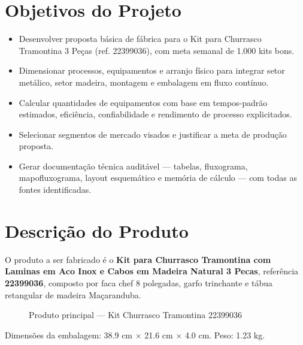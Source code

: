 \documentclass[12pt,a4paper,oneside,english,brazil]{abntex2}
\begin{document}
\imprimircapa

\tableofcontents*
\clearpage

\chapter{Objetivos do Projeto}
\begin{itemize}
  \item Desenvolver proposta básica de fábrica para o Kit para Churrasco Tramontina 3 Peças (ref. 22399036), com meta semanal de 1.000 kits bons.
  \item Dimensionar processos, equipamentos e arranjo físico para integrar setor metálico, setor madeira, montagem e embalagem em fluxo contínuo.
  \item Calcular quantidades de equipamentos com base em tempos-padrão estimados, eficiência, confiabilidade e rendimento de processo explicitados.
  \item Selecionar segmentos de mercado visados e justificar a meta de produção proposta.
  \item Gerar documentação técnica auditável — tabelas, fluxograma, mapofluxograma, layout esquemático e memória de cálculo — com todas as fontes identificadas.
\end{itemize}

\chapter{Descrição do Produto}
O produto a ser fabricado é o \textbf{Kit para Churrasco Tramontina com Laminas em Aco Inox e Cabos em Madeira Natural 3 Pecas}, referência \textbf{22399036}, composto por faca chef 8 polegadas, garfo trinchante e tábua retangular de madeira Maçaranduba.

\begin{figure}[H]
  \centering
  
  \caption{Produto principal --- Kit Churrasco Tramontina 22399036}
\end{figure}

Dimensões da embalagem: 38.9 cm × 21.6 cm × 4.0 cm. Peso: 1.23 kg.
\end{document}
